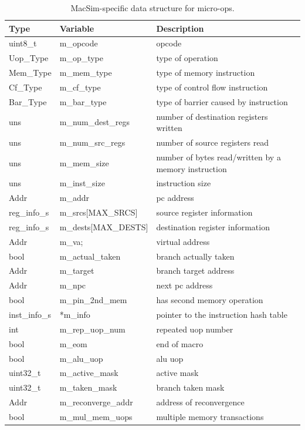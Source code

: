 \begin{table}[htb]
\begin{footnotesize}
\begin{center}
\caption{MacSim-specific data structure for micro-ops.}
\label{table:trace_uops}
\begin{tabular}{|l|l|l|} 
\hline
Type      & Variable                 & Description \\ \hline 
uint8\_t  & m\_opcode                & opcode \\ \hline
Uop\_Type & m\_op\_type              & type of operation \\ \hline
Mem\_Type & m\_mem\_type             & type of memory instruction \\ \hline
Cf\_Type  & m\_cf\_type              & type of control flow instruction \\ \hline
Bar\_Type & m\_bar\_type             & type of barrier caused by instruction \\ \hline
uns       &   m\_num\_dest\_regs     & number of destination registers written \\ \hline
uns       &   m\_num\_src\_regs      & number of source registers read \\ \hline
uns       &   m\_mem\_size           & number of bytes read/written by a memory instruction \\ \hline
uns       &   m\_inst\_size          & instruction size \\ \hline
Addr      &   m\_addr                & pc address  \\ \hline
reg\_info\_s&   m\_srcs[MAX\_SRCS]   & source register information \\ \hline
reg\_info\_s&   m\_dests[MAX\_DESTS] & destination register information \\ \hline
Addr      &   m\_va;                 & virtual address \\ \hline
bool      &   m\_actual\_taken       & branch actually taken \\ \hline
Addr      &   m\_target              & branch target address \\ \hline
Addr      &   m\_npc                 & next pc address  \\ \hline
bool      &   m\_pin\_2nd\_mem       & has second memory operation \\ \hline
inst\_info\_s& *m\_info              & pointer to the instruction hash table  \\ \hline
int       &   m\_rep\_uop\_num       & repeated uop number \\ \hline
bool      &   m\_eom                 & end of macro \\ \hline
bool      &   m\_alu\_uop            & alu uop  \\ \hline
uint32\_t  &   m\_active\_mask       & active mask \\ \hline
uint32\_t  &   m\_taken\_mask        & branch taken mask \\ \hline
Addr      &   m\_reconverge\_addr    & address of reconvergence \\ \hline
bool      &   m\_mul\_mem\_uops      & multiple memory transactions \\ \hline


\end{tabular}
\end{center}
\end{footnotesize}
\end{table}
